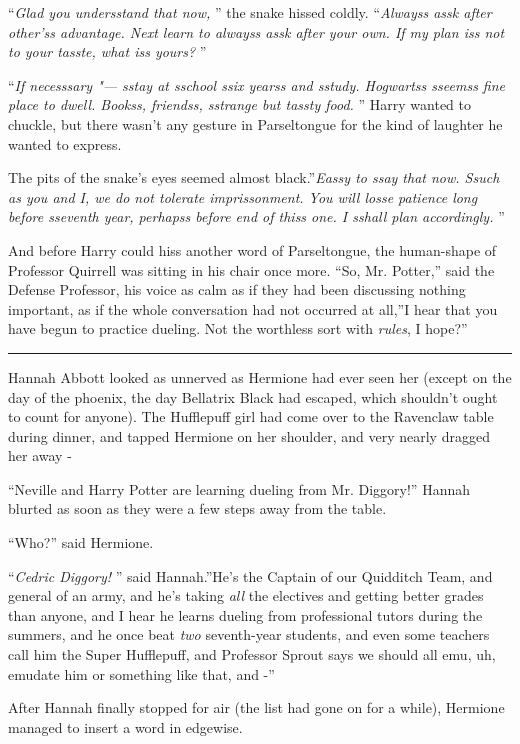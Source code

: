 ``\emph{Glad you undersstand that now,} '' the snake hissed coldly.
``\emph{Alwayss assk after other'ss advantage. Next learn to alwayss assk
after your own. If my plan iss not to your tasste, what iss yours?} ''

``\emph{If necesssary "--- sstay at sschool ssix yearss and sstudy.
Hogwartss sseemss fine place to dwell. Bookss, friendss, sstrange but
tassty food.} '' Harry wanted to chuckle, but there wasn't any gesture in
Parseltongue for the kind of laughter he wanted to express.

The pits of the snake's eyes seemed almost black.''\emph{Eassy to ssay
that now. Ssuch as you and I, we do not tolerate imprissonment. You will
losse patience long before sseventh year, perhapss before end of thiss
one. I sshall plan accordingly.} ''

And before Harry could hiss another word of Parseltongue, the
human-shape of Professor Quirrell was sitting in his chair once more.
``So, Mr. Potter,'' said the Defense Professor, his voice as calm as if
they had been discussing nothing important, as if the whole conversation
had not occurred at all,''I hear that you have begun to practice
dueling. Not the worthless sort with \emph{rules}, I hope?''

\begin{center}\rule{3in}{0.4pt}\end{center}

Hannah Abbott looked as unnerved as Hermione had ever seen her (except
on the day of the phoenix, the day Bellatrix Black had escaped, which
shouldn't ought to count for anyone). The Hufflepuff girl had come over
to the Ravenclaw table during dinner, and tapped Hermione on her
shoulder, and very nearly dragged her away -

``Neville and Harry Potter are learning dueling from Mr. Diggory!''
Hannah blurted as soon as they were a few steps away from the table.

``Who?'' said Hermione.

``\emph{Cedric Diggory!} '' said Hannah.''He's the Captain of our
Quidditch Team, and general of an army, and he's taking \emph{all} the
electives and getting better grades than anyone, and I hear he learns
dueling from professional tutors during the summers, and he once beat
\emph{two} seventh-year students, and even some teachers call him the
Super Hufflepuff, and Professor Sprout says we should all emu, uh,
emudate him or something like that, and -''

After Hannah finally stopped for air (the list had gone on for a while),
Hermione managed to insert a word in edgewise.

